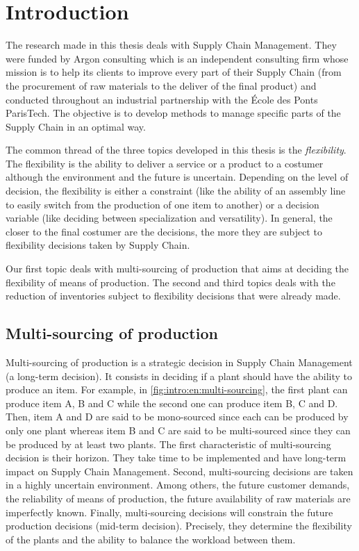 \chapter{Introduction}
\label{chap:intro:en}


The research made in this thesis deals with Supply Chain Management.
They were funded by Argon consulting which is an independent consulting firm whose mission is to help its clients to improve every part of their Supply Chain (from the procurement of raw materials to the deliver of the final product) and conducted throughout an industrial partnership with the \'Ecole des Ponts ParisTech.
The objective is to develop methods to manage specific parts of the Supply Chain in an optimal way.



The common thread of the three topics developed in this thesis is the \emph{flexibility}.
The flexibility is the ability to deliver a service or a product to a costumer although the environment and the future is uncertain.
Depending on the level of decision, the flexibility is either a constraint (like the ability of an assembly line to easily switch from the production of one item to another) or a decision variable (like deciding between specialization and versatility).
In general, the closer to the final costumer are the decisions, the more they are subject to flexibility decisions taken by Supply Chain.


Our first topic deals with multi-sourcing of production that aims at deciding the flexibility of means of production.
The second and third topics deals with the reduction of inventories subject to flexibility decisions that were already made.


\section{Multi-sourcing of production}
\label{sec:intro:en:multi-sourcing}


Multi-sourcing of production is a strategic decision in Supply Chain Management (\ie a long-term decision).
It consists in deciding if a plant should have the ability to produce an item.
For example, in \cref{fig:intro:en:multi-sourcing}, the first plant can produce item A, B and C while the second one can produce item B, C and D.
Then, item A and D are said to be mono-sourced since each can be produced by only one plant whereas item B and C are said to be multi-sourced since they can be produced by at least two plants.
The first characteristic of multi-sourcing decision is their horizon.
They take time to be implemented and have long-term impact on Supply Chain Management.
Second, multi-sourcing decisions are taken in a highly uncertain environment.
Among others, the future customer demands, the reliability of means of production, the future availability of raw materials are imperfectly known.
Finally, multi-sourcing decisions will constrain the future production decisions (\ie mid-term decision).
Precisely, they determine the flexibility of the plants and the ability to balance the workload between them.


